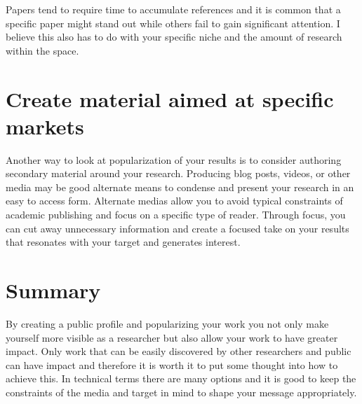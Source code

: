 Papers tend to require time to accumulate references and it is common that a specific paper might stand out while others fail to gain significant attention.
I believe this also has to do with your specific niche and the amount of research within the space.

\section{Create material aimed at specific markets}

Another way to look at popularization of your results is to consider authoring secondary material around your research.
Producing blog posts, videos, or other media may be good alternate means to condense and present your research in an easy to access form.
Alternate medias allow you to avoid typical constraints of academic publishing and focus on a specific type of reader.
Through focus, you can cut away unnecessary information and create a focused take on your results that resonates with your target and generates interest.

\section{Summary}

By creating a public profile and popularizing your work you not only make yourself more visible as a researcher but also allow your work to have greater impact.
Only work that can be easily discovered by other researchers and public can have impact and therefore it is worth it to put some thought into how to achieve this.
In technical terms there are many options and it is good to keep the constraints of the media and target in mind to shape your message appropriately.
